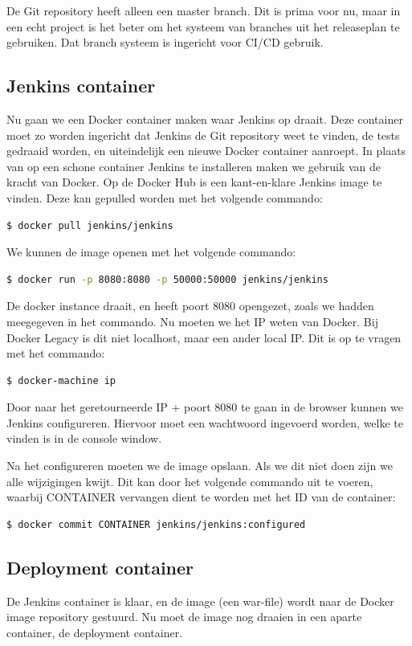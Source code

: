 \documentclass[12pt]{article}
\begin{document}
De Git repository heeft alleen een master branch. Dit is prima voor nu, maar in een echt project is het beter om het systeem van branches uit het releaseplan te gebruiken. Dat branch systeem is ingericht voor CI/CD gebruik.

\subsection{Jenkins container}
Nu gaan we een Docker container maken waar Jenkins op draait. Deze container moet zo worden ingericht dat Jenkins de Git repository weet te vinden, de tests gedraaid worden, en uiteindelijk een nieuwe Docker container aanroept.
\linebreak
In plaats van op een schone container Jenkins te installeren maken we gebruik van de kracht van Docker. Op de Docker Hub is een kant-en-klare Jenkins image te vinden. Deze kan gepulled worden met het volgende commando:

\begin{lstlisting}[language=Bash]
    $ docker pull jenkins/jenkins
\end{lstlisting}

\noindent We kunnen de image openen met het volgende commando:

\begin{lstlisting}[language=Bash]
    $ docker run -p 8080:8080 -p 50000:50000 jenkins/jenkins
\end{lstlisting}

\noindent De docker instance draait, en heeft poort 8080 opengezet, zoals we hadden meegegeven in het commando. Nu moeten we het IP weten van Docker. Bij Docker Legacy is dit niet localhost, maar een ander local IP. Dit is op te vragen met het commando:

\begin{lstlisting}[language=Bash]
    $ docker-machine ip
\end{lstlisting}

\noindent Door naar het geretourneerde IP + poort 8080 te gaan in de browser kunnen we Jenkins configureren. Hiervoor moet een wachtwoord ingevoerd worden, welke te vinden is in de console window.


Na het configureren moeten we de image opslaan. Als we dit niet doen zijn we alle wijzigingen kwijt. Dit kan door het volgende commando uit te voeren, waarbij CONTAINER vervangen dient te worden met het ID van de container:

\begin{lstlisting}[language=Bash]
    $ docker commit CONTAINER jenkins/jenkins:configured
\end{lstlisting}



\subsection{Deployment container}
De Jenkins container is klaar, en de image (een war-file) wordt naar de Docker image repository gestuurd. Nu moet de image nog draaien in een aparte container, de deployment container.

\end{document}
